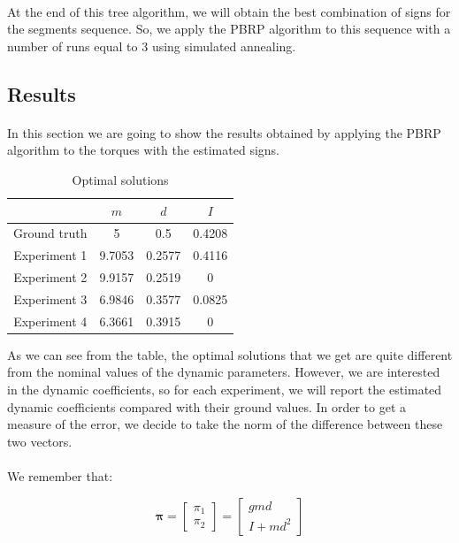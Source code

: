 \documentclass{article}
\begin{document}
\paragraph{}At the end of this tree algorithm, we will obtain the best combination of signs for the segments sequence. So, we apply the PBRP algorithm to this sequence with a number of runs equal to 3 using simulated annealing.

\subsection{Results}
\paragraph{}In this section we are going to show the results obtained by applying the PBRP algorithm to the torques with the estimated signs.

\begin{table}[!htbp]
\centering
\begin{tabular}{|c|ccc|}
\hline
& $m$ & $d$ & $I$\\
\hline
Ground truth & 5 & 0.5 & 0.4208\\
Experiment 1 & 9.7053 & 0.2577 & 0.4116\\
Experiment 2 & 9.9157 & 0.2519 & 0\\
Experiment 3 & 6.9846 & 0.3577 & 0.0825\\
Experiment 4 & 6.3661 & 0.3915 & 0\\
\hline
\end{tabular}
\caption{Optimal solutions}
\end{table}

As we can see from the table, the optimal solutions that we get are quite different from the nominal values of the dynamic parameters. However, we are interested in the dynamic coefficients, so for each experiment, we will report the estimated dynamic coefficients compared with their ground values. In order to get a measure of the error, we decide to take the norm of the difference between these two vectors.

\paragraph{}We remember that:

\[\bm{\pi}= \begin{bmatrix}
\pi_1 \\ \pi_2
\end{bmatrix} = \begin{bmatrix}
gmd \\ I +md^2
\end{bmatrix}\]
\end{document}
